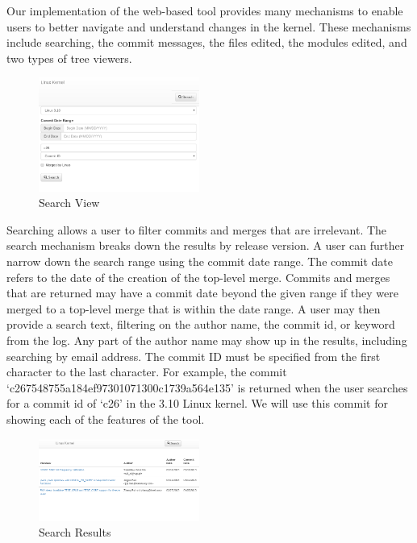 \documentclass[conference, draftclsnofoot]{IEEEtran}
\begin{document}
Our implementation of the web-based tool provides many mechanisms to enable
users to better navigate and understand changes in the kernel. These mechanisms
include searching, the commit messages, the files edited, the modules edited,
and two types of tree viewers.

\begin{figure}[h]
	\centering
	\includegraphics[width=0.47\textwidth]{figures/search.png}
	\caption{Search View}
	\label{fig:search}
\end{figure}

Searching allows a user to filter commits and merges that are irrelevant.
The search mechanism breaks down the results by release version. A user can
further narrow down the search range using the commit date range. The commit
date refers to the date of the creation of the top-level merge. Commits and
merges that are returned may have a commit date beyond the given range if they
were merged to a top-level merge that is within the date range. A user may then
provide a search text, filtering on the author name, the commit id, or keyword
from the log. Any part of the author name may show up in the results, including
searching by email address. The commit ID must be specified from the first
character to the last character. For example, the commit
`c267548755a184ef97301071300c1739a564e135' is returned when the user searches
for a commit id of `c26' in the 3.10 Linux kernel. We will use this commit for
showing each of the features of the tool.

\begin{figure}[h]
	\centering
	\includegraphics[width=0.47\textwidth]{figures/search_results.png}
	\caption{Search Results}
	\label{fig:results}
\end{figure}
\end{document}
